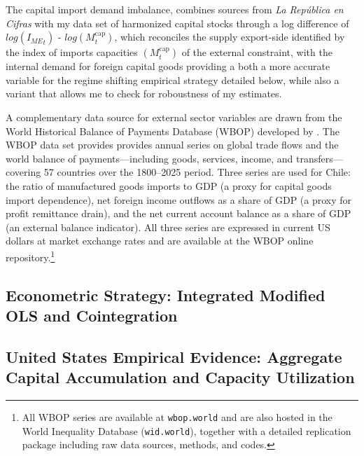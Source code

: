The capital import demand imbalance, combines sources from \textit{La República en Cifras} with my data set of harmonized capital stocks through a log difference of $log({I_{ME}}_t)$ - $log(M^{\text{cap}}_t)$, which reconciles the supply export-side identified by the index of imports capacities $(M^{\text{cap}}_t)$ of the external constraint, with the internal demand for foreign capital goods providing a both a more accurate variable for the regime shifting empirical strategy detailed below, while also a variant that allows me to check for roboustness of my estimates. 

A complementary data source for external sector variables are drawn from the World Historical Balance of Payments Database (WBOP) developed by
\citet{NievasPiketty2025}. The WBOP data set provides provides annual series on global trade flows and the world balance of payments---including goods,
services, income, and transfers---covering 57 countries over
the 1800--2025 period. Three series are used for Chile: the ratio
of manufactured goods imports to GDP (a proxy for capital goods
import dependence), net foreign income outflows as a share of GDP (a
proxy for profit remittance drain), and the net current account
balance as a share of GDP (an external balance indicator). All three
series are expressed in current US dollars at market exchange rates
and are available at the WBOP online repository.\footnote{All WBOP
	series are available at \texttt{wbop.world} and are also hosted in
	the World Inequality Database (\texttt{wid.world}), together with a
	detailed replication package including raw data sources, methods,
	and codes.}





\subsection{Econometric Strategy: Integrated Modified OLS and Cointegration}





\subsection{United States Empirical Evidence: Aggregate Capital Accumulation and Capacity Utilization}

